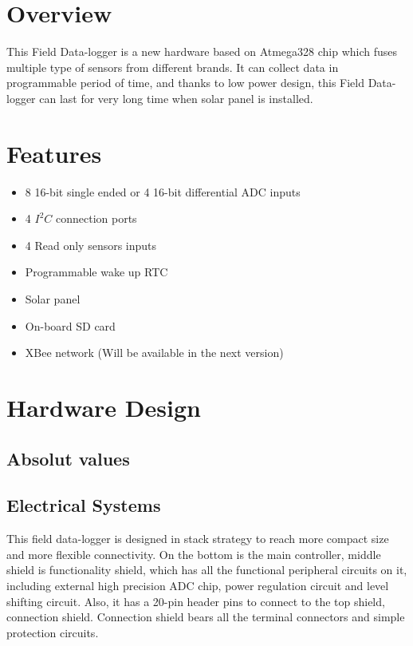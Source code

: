 \newpage
\tableofcontents \newpage
\listoffigures  \newpage

\newpage

\section{Overview}
    This Field Data-logger is a new hardware based on Atmega328 chip which fuses multiple type of sensors from different brands. It can collect data in programmable period of time, and thanks to low power design, this Field Data-logger can last for very long time when solar panel is installed.

\section{Features}
    \begin{itemize}
    \item 8 16-bit single ended or 4 16-bit differential ADC inputs
    \item 4 $I^{2}C$ connection ports
    \item 4 Read only sensors inputs
    \item Programmable wake up RTC
    \item Solar panel
    \item On-board SD card
    \item XBee network (Will be available in the next version)
    \end{itemize}


\newpage
\section{Hardware Design}
  \subsection{Absolut values}
    \label{absValue}
  \subsection{Electrical Systems}
  This field data-logger is designed in stack strategy to reach more compact size and more flexible connectivity. On the bottom is the main controller, middle shield is functionality shield, which has all the functional peripheral circuits on it, including external high precision ADC chip, power regulation circuit and level shifting circuit. Also, it has a 20-pin header pins to connect to the top shield, connection shield. Connection shield bears all the terminal connectors and simple protection circuits.

